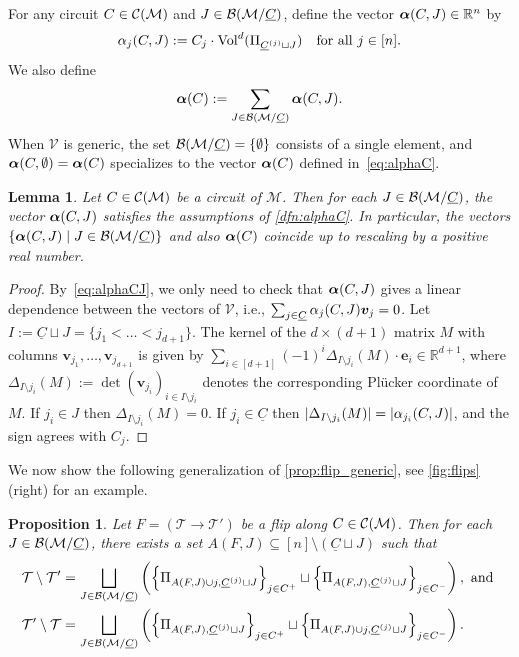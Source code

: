 \documentclass[11pt]{amsart}
\theoremstyle{plain}
\newtheorem{proposition}[theorem]{Proposition}
\newtheorem{lemma}[theorem]{Lemma}
\theoremstyle{definition}
\def\R{\mathbb{R}}
\def\v{{\bm{v}}}
\def\V{\mathcal{V}}
\def\e{{\bm{e}}}
\def\Vol{\mathrm{Vol}}
\def\VC{\V}
\def\Mcal{\mathcal{M}}
\def\Tcal{\mathcal{T}}
\def\suppC{{\underline{C}}}
\def\Tiling{\Tcal}
\def\tile{\Pi}
\def\VolX(#1){\Vol^d(\tile_{#1})}
\let\subset\subseteq
\begin{document}
For any circuit $C\in\Circuits$ and $J\in\BMC$, define the vector $\alphaCJ\in\R^n$ by
\begin{equation}\label{eq:alphaCJ}
\alphaCJx_j:=C_j\cdot \VolX(\sC^j\sqcup J)\quad\text{for all $j\in[n]$}.
\end{equation}
We also define 
\begin{equation}\label{eq:alpha2}
\alphaC:=\sum_{J\in\BMC} \alphaCJ.
\end{equation}
When $\VC$ is generic, the set $\BMC=\{\emptyset\}$ consists of a single element, and $\alphaXX(C,\emptyset)=\alphaC$ specializes to the vector $\bm{\alpha}(C)$ defined in~\eqref{eq:alphaC}.


\begin{lemma}  \label{lemma:alpha_dep}
Let $C\in\Circuits$ be a circuit of $\Mcal$. Then for each $J\in\BMC$, the vector $\bm{\alpha}(C,J)$ satisfies the assumptions of \cref{dfn:alphaC}. In particular, the vectors $\{\alphaCJ\mid J\in\BMC\}$ and also
	$\bm{\alpha}(C)$ coincide up to rescaling by a positive real number.
\end{lemma}
\begin{proof}
By~\eqref{eq:alphaCJ}, we only need to check that $\bm{\alpha}(C,J)$ gives a linear dependence between the vectors of $\VC$, i.e., $\sum_{j\in\suppC}\alphaCJx_j\v_j=0$. Let $I:=\suppC\sqcup J=\{j_1<\dots<j_{d+1}\}$. The kernel of the $d\times (d+1)$ matrix $M$ with columns $\v_{j_1},\dots,\v_{j_{d+1}}$ is given by $\sum_{i\in[d+1]} (-1)^i \Delta_{I\setminus j_i}(M)\cdot \e_i\in\R^{d+1}$, where $\Delta_{I\setminus j_i}(M):=\det(\v_{j_i})_{i\in I\setminus j_i}$ denotes the corresponding Pl\"ucker coordinate of $M$. If $j_i\in J$ then $\Delta_{I\setminus j_i}(M)=0$. If $j_i\in \suppC$ then $|\Delta_{I\setminus j_i}(M)|=|\alphaCJx_{j_i}|$, and the sign agrees with $C_j$.
\end{proof}

We now show the following generalization of \cref{prop:flip_generic}, see \cref{fig:flips} (right) for an example. 
\begin{proposition}\label{prop:flip_arb}
Let $F=(\Tiling\to\Tiling')$ be a flip along $C\in\Circuits$. Then for each $J\in\BMC$, there exists a set $A(F,J)\subset [n]\setminus (\suppC\sqcup J)$ such that
\begin{align*}
	\Tiling\setminus \Tiling'&= \bigsqcup_{J\in\BMC} \left(\left\{\tile_{A(F,J)\cup j,\sC^j\sqcup J}\right\}_{j\in C^+}\sqcup \left\{\tile_{A(F,J),\sC^j\sqcup J}\right\}_{j\in C^-}\right), \text{ and }\\
 \Tiling'\setminus \Tiling&= \bigsqcup_{J\in\BMC} \left(\left\{\tile_{A(F,J),\sC^j\sqcup J}\right\}_{j\in C^+}\sqcup \left\{\tile_{A(F,J)\cup j,\sC^j\sqcup J}\right\}_{j\in C^-}\right).
\end{align*}
\end{proposition}
\end{document}
